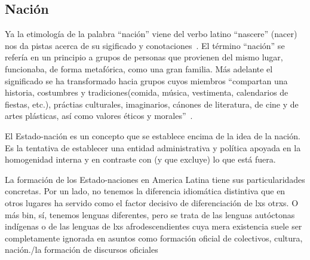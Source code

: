 \subsection{Nación}

Ya la etimología de la palabra ``nación'' viene del verbo latino ``nascere'' (nacer) nos da pistas acerca de su sigificado y conotaciones~\autocite[189]{SzIr2009}.
El término ``nación'' se refería en un principio a grupos de personas que provienen del mismo lugar, funcionaba, de forma metafórica, como una gran familia.
Más adelante el significado se ha transformado hacia grupos cuyos miembros
``compartan una historia, costumbres y tradiciones(comida, música, vestimenta, calendarios de fiestas, etc.), práctias culturales, imaginarios, cánones de literatura, de cine y de artes plásticas, así como valores éticos y morales''~\autocite[190]{SzIr2009}.

El Estado-nación es un concepto que se establece encima de la idea de la nación.
Es la tentativa de establecer una entidad administrativa y política apoyada en la homogenidad interna y en contraste con (y que excluye) lo que está fuera.

La formación de los Estado-naciones en America Latina tiene sus particularidades concretas.
Por un lado, no tenemos la diferencia idiomática distintiva que en otros lugares ha servido como el factor decisivo de diferenciación de lxs otrxs.
O más bin, sí, tenemos lenguas diferentes, pero se trata de las lenguas autóctonas indígenas o de las lenguas de lxs afrodescendientes cuya mera existencia suele ser completamente ignorada en asuntos como formación oficial de colectivos, cultura, nación./la formación de discursos oficiales

